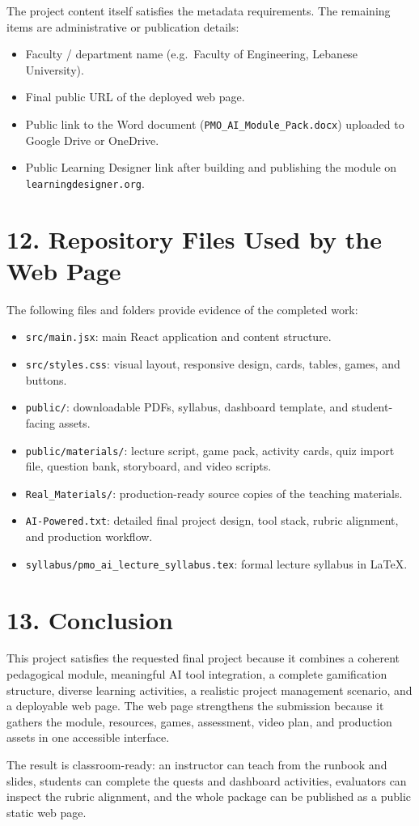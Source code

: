 \documentclass[11pt,a4paper]{article}
\begin{document}
The project content itself satisfies the metadata requirements. The remaining items are administrative or publication details:

\begin{itemize}
  \item Faculty / department name (e.g.\ Faculty of Engineering, Lebanese University).
  \item Final public URL of the deployed web page.
  \item Public link to the Word document (\texttt{PMO\_AI\_Module\_Pack.docx}) uploaded to Google Drive or OneDrive.
  \item Public Learning Designer link after building and publishing the module on \texttt{learningdesigner.org}.
\end{itemize}

\section*{12. Repository Files Used by the Web Page}

The following files and folders provide evidence of the completed work:

\begin{itemize}
  \item \texttt{src/main.jsx}: main React application and content structure.
  \item \texttt{src/styles.css}: visual layout, responsive design, cards, tables, games, and buttons.
  \item \texttt{public/}: downloadable PDFs, syllabus, dashboard template, and student-facing assets.
  \item \texttt{public/materials/}: lecture script, game pack, activity cards, quiz import file, question bank, storyboard, and video scripts.
  \item \texttt{Real\_Materials/}: production-ready source copies of the teaching materials.
  \item \texttt{AI-Powered.txt}: detailed final project design, tool stack, rubric alignment, and production workflow.
  \item \texttt{syllabus/pmo\_ai\_lecture\_syllabus.tex}: formal lecture syllabus in LaTeX.
\end{itemize}

\section*{13. Conclusion}

This project satisfies the requested final project because it combines a coherent pedagogical module, meaningful AI tool integration, a complete gamification structure, diverse learning activities, a realistic project management scenario, and a deployable web page. The web page strengthens the submission because it gathers the module, resources, games, assessment, video plan, and production assets in one accessible interface.

The result is classroom-ready: an instructor can teach from the runbook and slides, students can complete the quests and dashboard activities, evaluators can inspect the rubric alignment, and the whole package can be published as a public static web page.
\end{document}
